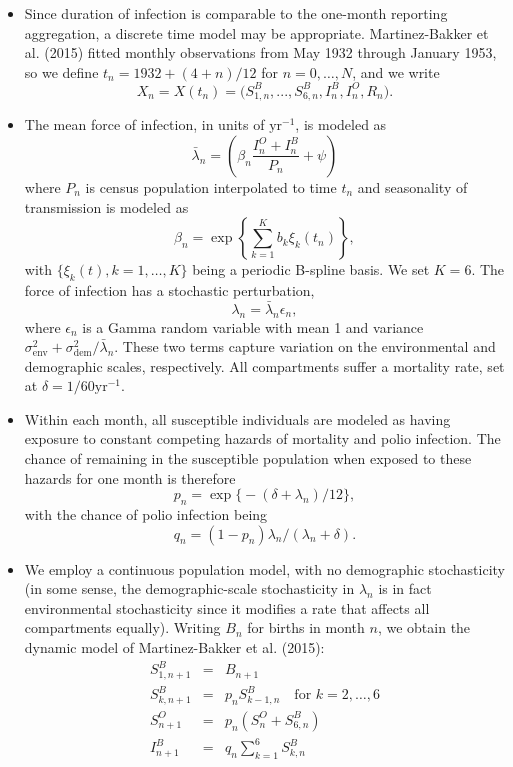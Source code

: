 \documentclass[]{article}
\begin{document}
\begin{itemize}
\item
  Since duration of infection is comparable to the one-month reporting
  aggregation, a discrete time model may be appropriate. Martinez-Bakker
  et al. (2015) fitted monthly observations from May 1932 through
  January 1953, so we define \(t_n=1932+ (4+n)/12\) for \(n=0,\dots,N\),
  and we write
  \[X_n=X(t_n)=\big(S^B_{1,n},...,S^B_{6,n}, I^B_n,I^O_n,R_n \big).\]
\item
  The mean force of infection, in units of \(\mathrm{yr}^{-1}\), is
  modeled as
  \[\bar\lambda_n=\left( \beta_n \frac{I^O_n+I^B_n}{P_n} + \psi \right)\]
  where \(P_n\) is census population interpolated to time \(t_n\) and
  seasonality of transmission is modeled as
  \[\beta_n=\exp\left\{ \sum_{k=1}^K b_k\xi_k(t_n) \right\},\] with
  \(\{\xi_k(t),k=1,\dots,K\}\) being a periodic B-spline basis. We set
  \(K=6\). The force of infection has a stochastic perturbation,
  \[\lambda_n = \bar\lambda_n \epsilon_n,\] where \(\epsilon_n\) is a
  Gamma random variable with mean 1 and variance
  \(\sigma^2_{\mathrm{env}} + \sigma^2_{\mathrm{dem}}\big/\bar\lambda_n\).
  These two terms capture variation on the environmental and demographic
  scales, respectively. All compartments suffer a mortality rate, set at
  \(\delta=1/60\mathrm{yr}^{-1}\).
\item
  Within each month, all susceptible individuals are modeled as having
  exposure to constant competing hazards of mortality and polio
  infection. The chance of remaining in the susceptible population when
  exposed to these hazards for one month is therefore
  \[p_n = \exp\big\{ -(\delta+\lambda_n)/12\big\},\] with the chance of
  polio infection being
  \[q_n = (1-p_n)\lambda_n\big/(\lambda_n+\delta).\]
\item
  We employ a continuous population model, with no demographic
  stochasticity (in some sense, the demographic-scale stochasticity in
  \(\lambda_n\) is in fact environmental stochasticity since it modifies
  a rate that affects all compartments equally). Writing \(B_n\) for
  births in month \(n\), we obtain the dynamic model of Martinez-Bakker
  et al. (2015): \[\begin{array}{rcl}
  S^B_{1,n+1}&=&B_{n+1}\\
  S^B_{k,n+1}&=&p_nS^B_{k-1,n} \quad\mbox{for $k=2,\dots,6$}\\
  S^O_{n+1}&=& p_n(S^O_n+S^B_{6,n})\\
  I^B_{n+1}&=& q_n \sum_{k=1}^6 S^B_{k,n}\\

\end{array}\]
\end{itemize}
\end{document}
